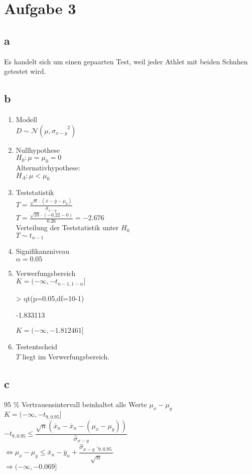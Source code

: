 

\section{Aufgabe 3}

\subsection{a}
Es handelt sich um einen gepaarten Test, weil jeder Athlet mit beiden Schuhen 
getestet wird. 

\subsection{b}
\begin{enumerate}
  \item Modell \\
    $ D \sim \mathcal{N}(\mu,{\hat{\sigma}_{x-y}}^2)$
  \item Nullhypothese \\
    $H_0: \mu=\mu_0=0$\\
    Alternativhypothese: \\
    $H_A: \mu<\mu_0$
  \item Teststatistik \\
    $T = \frac{\sqrt{n}\cdot(\bar{x}-\bar{y}-\mu_0)}{\hat{\sigma}_{x-y}}$ \\
    $T = \frac{\sqrt{10}\cdot(-0.22-0)}{0.26} = -2.676$ \\
    Verteilung der Teststatistik unter $H_0$\\
    $T \sim t_{n-1}$
  \item Signifikanzniveau \\
    $\alpha=0.05$
  \item Verwerfungsbereich \\
    $K = (-\infty,-t_{n-1,1-\alpha}]$
\begin{Schunk}
\begin{Sinput}
> qt(p=0.05,df=10-1)
\end{Sinput}
\begin{Soutput}
[1] -1.833113
\end{Soutput}
\end{Schunk}
    $K = (-\infty,-1.812461]$
  \item Testentscheid \\
    $T$ liegt im Verwerfungsbereich. 
\end{enumerate}

\subsection{c}
95 \% Vertrauensintervall beinhaltet alle Werte $\mu_x - \mu_y$ \\
$K=(-\infty, -t_{9,0.95}]$\\
$-t_{9,0.95} \leq 
\dfrac{\sqrt{n} (\bar{x}_n-\bar{x}_n-(\mu_x-\mu_y))}{\hat{\sigma}_{x-y}}$ \\
$\Leftrightarrow 
\mu_x-\mu_y \leq \bar{x}_n-\bar{y}_n+
\dfrac{\hat{\sigma}_{x-y}\cdot_{9,0.95}}{\sqrt{n}}$ \\
$\Rightarrow (-\infty,-0.069]$

